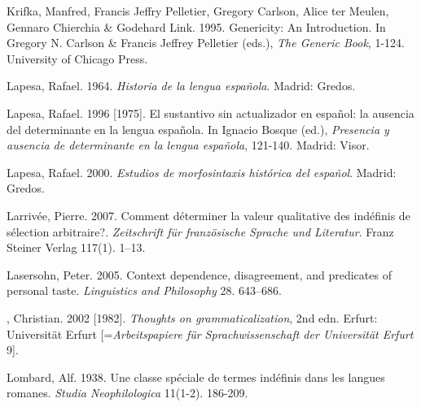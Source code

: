 \begin{styleStandard}
Krifka, Manfred, Francis Jeffry Pelletier, Gregory Carlson, Alice ter Meulen, Gennaro Chierchia \& Godehard Link. 1995. Genericity: An Introduction. In Gregory N. Carlson \& Francis Jeffrey Pelletier (eds.), \textit{The Generic Book}, 1-124. University of Chicago Press.
\end{styleStandard}

\begin{styleStandard}
Lapesa, Rafael. 1964. \textit{Historia de la lengua española}. Madrid: Gredos.
\end{styleStandard}

\begin{styleStandard}
Lapesa, Rafael. 1996 [1975]. El sustantivo sin actualizador en español: la ausencia del determinante en la lengua española. In Ignacio Bosque (ed.), \textit{Presencia y ausencia de determinante en la lengua española}, 121-140. Madrid: Visor.
\end{styleStandard}

\begin{styleStandard}
Lapesa, Rafael. 2000. \textit{Estudios de morfosintaxis histórica del español}. Madrid: Gredos.
\end{styleStandard}

\begin{styleStandard}
Larrivée, Pierre. 2007. Comment déterminer la valeur qualitative des indéfinis de sélection arbitraire?. \textit{Zeitschrift für französische Sprache und Literatur}. Franz Steiner Verlag 117(1). 1–13.
\end{styleStandard}

\begin{styleStandard}
Lasersohn, Peter. 2005. Context dependence, disagreement, and predicates of personal taste. \textit{Linguistics and Philosophy} 28. 643–686.
\end{styleStandard}

\begin{styleannotationtext}
, Christian. 2002 [1982]. \textit{Thoughts on grammaticalization}, 2nd edn. Erfurt: Universität Erfurt [=\textit{Arbeitspapiere für Sprachwissenschaft der Universität Erfurt} 9].
\end{styleannotationtext}

\begin{styleStandard}
Lombard, Alf. 1938. Une classe spéciale de termes indéfinis dans les langues romanes. \textit{Studia Neophilologica} 11(1-2). 186-209.
\end{styleStandard}

